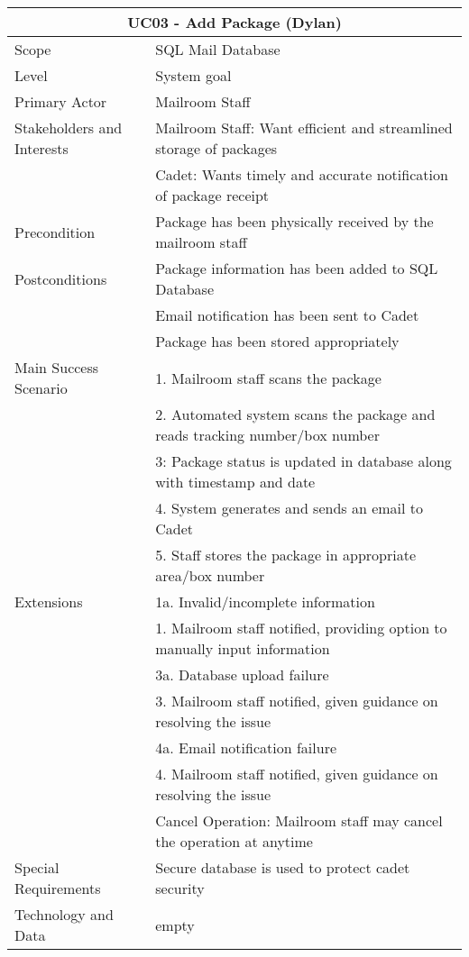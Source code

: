 \documentclass[11pt]{article}
\begin{document}

\begin{table}[tbp]
\vskip-2.0cm\hskip-3.0cm\begin{tabularx}{1.5\textwidth}{|X|X|}
\hline
\multicolumn{2}{|c|}{UC03 - Add Package (Dylan)} \\
\hline
Scope & SQL Mail Database \\
\hline
Level & System goal \\
\hline
Primary Actor & Mailroom Staff \\
\hline
Stakeholders and Interests & Mailroom Staff: Want efficient and streamlined storage of packages \\
 & Cadet: Wants timely and accurate notification of package receipt \\
\hline
Precondition & Package has been physically received by the mailroom staff \\
\hline
Postconditions & Package information has been added to SQL Database \\
 & Email notification has been sent to Cadet \\
 & Package has been stored appropriately \\
\hline
Main Success Scenario & 1. Mailroom staff scans the package \\
 & 2. Automated system scans the package and reads tracking number/box number \\
 & 3: Package status is updated in database along with timestamp and date \\
 & 4. System generates and sends an email to Cadet \\
 & 5. Staff stores the package in appropriate area/box number \\
\hline
Extensions & 1a. Invalid/incomplete information \\
 & 1. Mailroom staff notified, providing option to manually input information \\
 & 3a. Database upload failure \\
 & 3. Mailroom staff notified, given guidance on resolving the issue \\
 & 4a. Email notification failure \\
 & 4. Mailroom staff notified, given guidance on resolving the issue \\
 & Cancel Operation: Mailroom staff may cancel the operation at anytime \\
\hline
Special Requirements & Secure database is used to protect cadet security \\
\hline
Technology and Data & {empty} \\

\end{tabularx}
\end{table}
\end{document}
